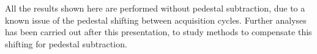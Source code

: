 \documentclass[conference]{IEEEtran}
\begin{document}
All the results shown here are performed without pedestal subtraction, due to a known issue of the pedestal shifting between acquisition cycles.
Further analyses has been carried out after this presentation,
to study methods to compensate this shifting for pedestal subtraction.


%
%



%
%
\end{document}
